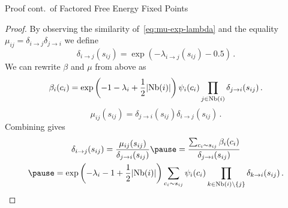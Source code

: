\begin{frame}{Proof cont.\ of Factored Free Energy Fixed Points}
    \begin{proof}
    By observing the similarity of~\eqref{eq:mu-exp-lambda} and the equality $\mu_{ij} = \delta_{i \rightarrow j} \delta_{j \rightarrow i}$ we define
    \begin{equation}
        \delta_{i \rightarrow j}(s_{ij}) = \exp( - \lambda_{i \rightarrow j}(s_{ij}) - 0.5) \,.
    \end{equation}
    \pause 
We can rewrite $\beta$ and $\mu$ from above as
    \begin{equation}
        \beta_i(c_i) = \exp\left(-1-\lambda_i + \frac{1}{2} |\text{Nb}(i)|\right) \psi_i(c_i) \prod_{j \in \text{Nb}(i)} \delta_{j \rightarrow i}(s_{ij})\,.
    \end{equation}
    \pause
    \begin{equation}
        \mu_{ij}(s_{ij}) = \delta_{j \rightarrow i}(s_{ij}) \delta_{i \rightarrow j}(s_{ij})\,.
    \end{equation}
    \pause
    Combining gives
    \begin{multline}
       \delta_{i \rightarrow j}(s_{ij}) = \frac{\mu_{ij}(s_{ij})}{\delta_{j \rightarrow i}(s_{ij})} 
       \pause = \frac{\sum_{c_i \sim s_{ij}} \beta_i(c_i)}{\delta_{j \rightarrow i}(s_{ij})} \\
       \pause = \exp\left( -\lambda_i - 1 + \frac{1}{2} \abs{\Nb(i)} \right) \sum_{c_i \sim s_{ij}} \psi_i(c_i) \prod_{k \in \Nb(i) \backslash \{j\}} \delta_{k \rightarrow i}(s_{ij})\,.
    \end{multline}
    \end{proof}
\end{frame}

